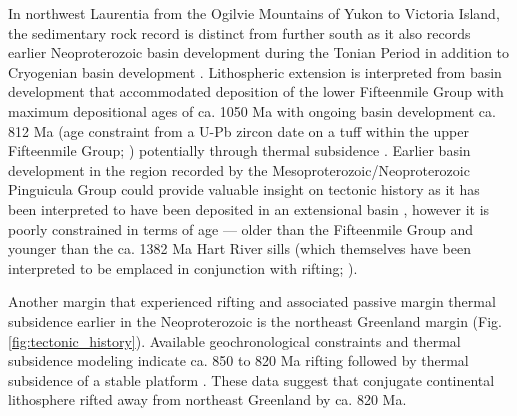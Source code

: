 \documentclass[twocolumn, switch]{article} %
\begin{document}
In northwest Laurentia from the Ogilvie Mountains of Yukon to Victoria Island, the sedimentary rock record is distinct from further south as it also records earlier Neoproterozoic basin development during the Tonian Period in addition to Cryogenian basin development \citep{Macdonald2012a}. Lithospheric extension is interpreted from basin development that accommodated deposition of the lower Fifteenmile Group with maximum depositional ages of ca. 1050 Ma with ongoing basin development ca. 812 Ma (age constraint from a U-Pb zircon date on a tuff within the upper Fifteenmile Group; \citealp{Macdonald2010a}) potentially through thermal subsidence \citep{Macdonald2012a}. Earlier basin development in the region recorded by the Mesoproterozoic/Neoproterozoic Pinguicula Group could provide valuable insight on tectonic history as it has been interpreted to have been deposited in an extensional basin \citep{Medig2016a}, however it is poorly constrained in terms of age --- older than the Fifteenmile Group and younger than the ca. 1382 Ma Hart River sills (which themselves have been interpreted to be emplaced in conjunction with rifting; \citealp{Verbaas2018a}).

Another margin that experienced rifting and associated passive margin thermal subsidence earlier in the Neoproterozoic is the northeast Greenland margin (Fig. \ref{fig:tectonic_history}). Available geochronological constraints and thermal subsidence modeling indicate ca. 850 to 820 Ma rifting followed by thermal subsidence of a stable platform \citep{Maloof2006a, Halverson2018a}. These data suggest that conjugate continental lithosphere rifted away from northeast Greenland by ca. 820 Ma.
\end{document}
